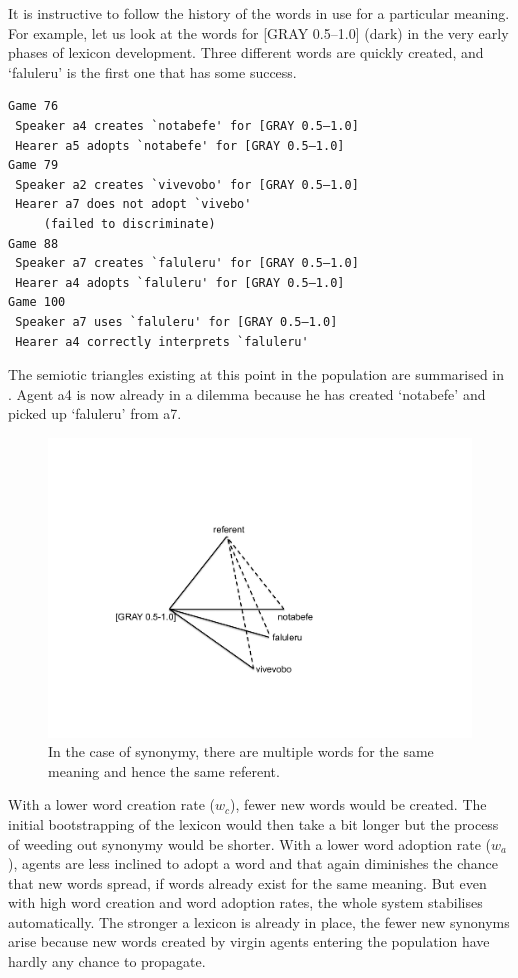 It is instructive to follow the history of the words 
in use for a particular meaning. For 
example, let us look at the words for [GRAY 0.5–1.0] 
(dark) in the very early phases of lexicon development.
Three different words are quickly created, and 
`faluleru' is the first one that has some success. 
\begin{verbatim}
Game 76
 Speaker a4 creates `notabefe' for [GRAY 0.5–1.0]
 Hearer a5 adopts `notabefe' for [GRAY 0.5–1.0]
Game 79 
 Speaker a2 creates `vivevobo' for [GRAY 0.5–1.0]
 Hearer a7 does not adopt `vivebo' 
     (failed to discriminate)
Game 88 
 Speaker a7 creates `faluleru' for [GRAY 0.5–1.0]
 Hearer a4 adopts `faluleru' for [GRAY 0.5–1.0]
Game 100 
 Speaker a7 uses `faluleru' for [GRAY 0.5–1.0]
 Hearer a4 correctly interprets `faluleru'
\end{verbatim}
The semiotic triangles existing at this point in the population are 
summarised in . 
Agent {\bfshape  a4} is now already in a dilemma because he has created
`notabefe' and picked up `faluleru' from {\bfshape  a7}. 


\begin{figure}[htbp]
  \centerline{\includegraphics[width=.50\textwidth]{chap6/figs/triangle6.pdf}}
\caption{\label{triangle6}In the case of synonymy, 
there are multiple words for the same meaning and hence the 
same referent.}
\end{figure}

With a lower word creation rate ($w_{c}$), 
fewer new words would be created. The initial bootstrapping
of the lexicon would then take a bit longer but the 
process of weeding out synonymy would be shorter. 
With a lower word adoption rate ($w_{a}$), agents are
less inclined to adopt a word and that again diminishes
the chance that new words spread, if words already 
exist for the same meaning. But even with high word creation
and word adoption rates, the whole system stabilises automatically. 
The stronger a lexicon is already in place, the fewer
new synonyms arise because new words
created by virgin agents entering the population have hardly 
any chance to propagate. 

